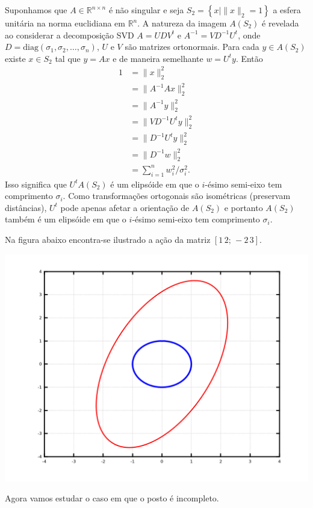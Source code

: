 \documentclass[a4paper,12pt, leqno, answers]{exam}
\begin{document}
\begin{questions}
\begin{solution}
        Suponhamos que $A \in \mathbb{R}^{n \times n}$ \'{e} n\~{a}o singular e seja $S_2 = \left\{ x \mid \| x \|_2 = 1 \right\}$ a esfera unit\'{a}ria na norma euclidiana em $\mathbb{R}^n$. A natureza da imagem $A(S_2)$ \'{e} revelada ao considerar a decomposi\c{c}\~{a}o SVD $A = U D V^t$ e $A^{-1} = V D^{-1} U^t$, onde $D = \mathrm{diag}(\sigma_1, \sigma_2, \ldots, \sigma_n)$, $U$ e $V$ s\~{a}o matrizes ortonormais. Para cada $y \in A(S_2)$ existe $x \in S_2$ tal que $y = A x$ e de maneira semelhante $w = U^t y$. Ent\~{a}o
        \begin{align*}
            1 &= \| x \|_2^2 \\
            &= \| A^{-1} A x \|_2^2 \\
            &= \| A^{-1} y \|_2^2 \\
            &= \| V D^{-1} U^t y \|_2^2 \\
            &= \| D^{-1} U^t y \|_2^2 \\
            &= \| D^{-1} w \|_2^2 \\
            &= \sum_{i = 1}^n w_i^2 / \sigma_i^2.
        \end{align*}
        Isso significa que $U^t A(S_2)$ \'{e} um elips\'{o}ide em que o $i$-\'{e}simo semi-eixo tem comprimento $\sigma_i$. Como transforma\c{c}\~{o}es ortogonais s\~{a}o isom\'{e}tricas (preservam dist\^{a}ncias), $U^t$ pode apenas afetar a orienta\c{c}\~{a}o de $A(S_2)$ e portanto $A(S_2)$ tamb\'{e}m \'{e} um elips\'{o}ide em que o $i$-\'{e}simo semi-eixo tem comprimento $\sigma_i$.

        Na figura abaixo encontra-se ilustrado a a\c{c}\~{a}o da matriz $[1 \, 2; \, -2 \, 3]$.
        \begin{center}
            \includegraphics[width=.5\textwidth]{lista11_esfb.png}
        \end{center}

        Agora vamos estudar o caso em que o posto \'{e} incompleto.


\end{solution}
\end{questions}
\end{document}
